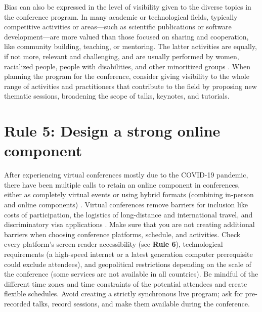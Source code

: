 \documentclass[10pt,letterpaper]{article}
\begin{document}
Bias can also be expressed in the level of visibility given to the diverse topics in the conference program.
In many academic or technological fields, typically competitive activities or areas---such as scientific publications or software development---are more valued than those focused on sharing and cooperation, like community building, teaching, or mentoring. 
The latter activities are equally, if not more, relevant and challenging, and are usually performed by women, racialized people, people with disabilities, and other minoritized groups \cite{cheng2020x+, burfordHomelinessMeantHaving2020, light_gender_2022}.
When planning the program for the conference, consider giving visibility to the whole range of activities and practitioners that contribute to the field by proposing new thematic sessions, broadening the scope of talks, keynotes, and tutorials. 


\section*{Rule 5: Design a strong online component} 
\label{rule_online}

After experiencing virtual conferences mostly due to the COVID-19 pandemic, there have been multiple calls to retain an online component in conferences, either as completely virtual events or using hybrid formats (combining in-person and online components) \cite{jooKeepOnlineOption2021, woolstonLearningLoveVirtual2020, ninerBetterWhomLeveling2021, roosOnlineConferencesNew2020, levitisCenteringInclusivityDesign2021, sarabipourChangingScientificMeetings2021}.
Virtual conferences remove barriers for inclusion like costs of participation, the logistics of long-distance and international travel, and discriminatory visa applications \cite{jooKeepOnlineOption2021, ninerBetterWhomLeveling2021, salibaGettingGripsOnline2020, gichoraTenSimpleRules2010a}. 
Make sure that you are not creating additional barriers when choosing conference platforms, schedule, and activities. 
Check every platform's screen reader accessibility (see \textbf{Rule 6}), technological requirements (a high-speed internet or a latest generation computer prerequisite could exclude attendees), and geopolitical restrictions depending on the scale of the conference (some services are not available in all countries).
Be mindful of the different time zones and time constraints of the potential attendees and create flexible schedules.
Avoid creating a strictly synchronous live program; ask for pre-recorded talks, record sessions, and make them available during the conference.
\end{document}
